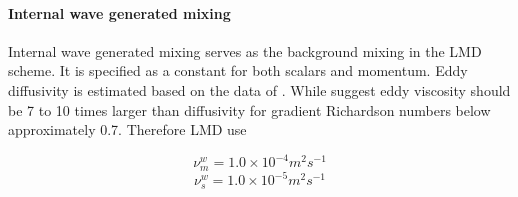 \paragraph{Internal wave generated mixing}
Internal wave generated mixing serves as the background mixing in the
LMD scheme.  It is specified as a constant for both scalars and
momentum.  Eddy diffusivity is estimated based on the data of
\cite{LWL93}.  While \cite{Peters88} suggest
eddy viscosity should be 7 to 10 times larger than diffusivity for
gradient Richardson numbers below approximately 0.7.  Therefore LMD use

\begin{equation}
\nu_{m}^w=1.0 \times 10^{-4} m^2 s^{-1}
\end{equation}
\begin{equation}
\nu_{s}^w=1.0 \times 10^{-5} m^2 s^{-1}
\end{equation}

